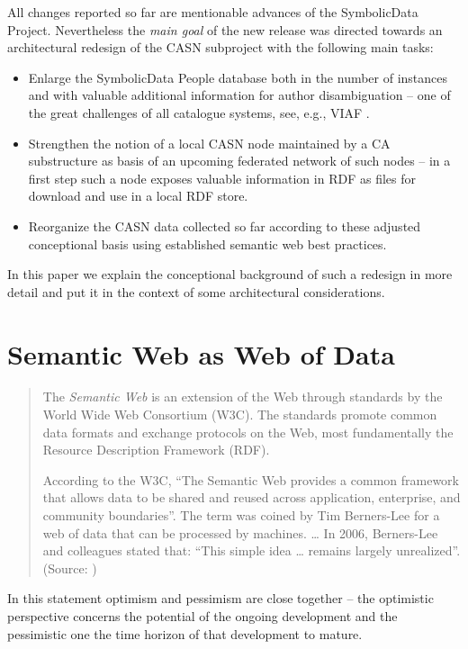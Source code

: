 \documentclass{llncs}
\newcommand{\SD}{{\sc Symbo\-lic\-Data}}
\begin{document}
All changes reported so far are mentionable advances of the {\SD} Project.
Nevertheless the \emph{main goal} of the new release was directed towards an
architectural redesign of the CASN subproject with the following main tasks:
\begin{itemize}
\item Enlarge the {\SD} People database both in the number of instances and
  with valuable additional information for author disambiguation -- one of the
  great challenges of all catalogue systems, see, e.g., VIAF \cite{viaf}.
\item Strengthen the notion of a local CASN node maintained by a CA
  substructure as basis of an upcoming federated network of such nodes -- in a
  first step such a node exposes valuable information in RDF as files for
  download and use in a local RDF store.
\item Reorganize the CASN data collected so far according to these adjusted
  conceptional basis using established semantic web best practices.
\end{itemize}
In this paper we explain the conceptional background of such a redesign in
more detail and put it in the context of some architectural considerations. 

\section{Semantic Web as Web of Data}

\begin{quote}
The \emph{Semantic Web} is an extension of the Web through standards by the
World Wide Web Consortium (W3C). The standards promote common data formats and
exchange protocols on the Web, most fundamentally the Resource Description
Framework (RDF).

According to the W3C, ``The Semantic Web provides a common framework that
allows data to be shared and reused across application, enterprise, and
community boundaries''. The term was coined by Tim Berners-Lee for a web of
data that can be processed by machines. {\ldots} In 2006, Berners-Lee and
colleagues stated that: ``This simple idea {\ldots} remains largely
unrealized''. (Source: \cite{Wikipedia:SemanticWeb})
\end{quote}
In this statement optimism and pessimism are close together -- the optimistic
perspective concerns the potential of the ongoing development and the
pessimistic one the time horizon of that development to mature.
\end{document}
